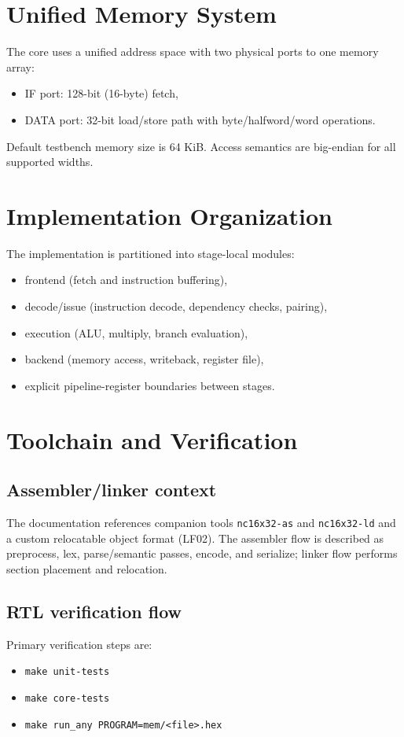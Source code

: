 \documentclass[11pt]{article}
\begin{document}
\section{Unified Memory System}
The core uses a unified address space with two physical ports to one memory array:
\begin{itemize}[leftmargin=*]
  \item IF port: 128-bit (16-byte) fetch,
  \item DATA port: 32-bit load/store path with byte/halfword/word operations.
\end{itemize}
Default testbench memory size is 64 KiB. Access semantics are big-endian for all supported widths.

\section{Implementation Organization}
The implementation is partitioned into stage-local modules:
\begin{itemize}[leftmargin=*]
  \item frontend (fetch and instruction buffering),
  \item decode/issue (instruction decode, dependency checks, pairing),
  \item execution (ALU, multiply, branch evaluation),
  \item backend (memory access, writeback, register file),
  \item explicit pipeline-register boundaries between stages.
\end{itemize}

\section{Toolchain and Verification}
\subsection{Assembler/linker context}
The documentation references companion tools \texttt{nc16x32-as} and \texttt{nc16x32-ld} and a custom relocatable object format (LF02). The assembler flow is described as preprocess, lex, parse/semantic passes, encode, and serialize; linker flow performs section placement and relocation.

\subsection{RTL verification flow}
Primary verification steps are:
\begin{itemize}[leftmargin=*]
  \item \texttt{make unit-tests}
  \item \texttt{make core-tests}
  \item \texttt{make run\_any PROGRAM=mem/<file>.hex}
\end{itemize}
\end{document}
